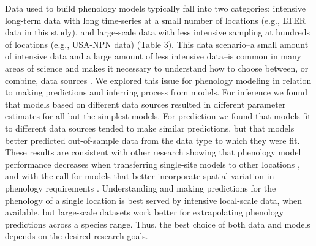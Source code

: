 \documentclass[fleqn,12pt,lineno]{article}
\begin{document}
Data used to build phenology models typically fall into two categories: intensive long-term data with long time-series at a small number of locations (e.g., LTER data in this study), and large-scale data with less intensive sampling at hundreds of locations (e.g., USA-NPN data) (Table 3). This data scenario--a small amount of intensive data and a large amount of less intensive data--is common in many areas of science and makes it necessary to understand how to choose between, or combine, data sources \citep{hanks2018}. We explored this issue for phenology modeling in relation to making predictions and inferring process from models. For inference we found that models based on different data sources resulted in different parameter estimates for all but the simplest models. For prediction we found that models fit to different data sources tended to make similar predictions, but that models better predicted out-of-sample data from the data type to which they were fit. These results are consistent with other research showing that phenology model performance decreases when transferring single-site models to other locations \citep{garcia-mozo2008, xu2013, basler2016}, and with the call for models that better incorporate spatial variation in phenology requirements \citep{richardson2013, chuine2017}. Understanding and making predictions for the phenology of a single location is best served by intensive local-scale data, when available, but large-scale datasets work better for extrapolating phenology predictions across a species range. Thus, the best choice of both data and models depends on the desired research goals.
\end{document}

